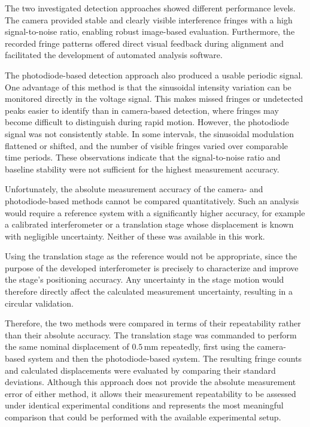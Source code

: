The two investigated detection approaches showed different performance levels. The camera provided stable and clearly visible interference fringes with a high signal-to-noise ratio, enabling robust image-based evaluation. Furthermore, the recorded fringe patterns offered direct visual feedback during alignment and facilitated the development of automated analysis software.

The photodiode-based detection approach also produced a usable periodic signal. One advantage of this method is that the sinusoidal intensity variation can be monitored directly in the voltage signal. This makes missed fringes or undetected peaks easier to identify than in camera-based detection, where fringes may become difficult to distinguish during rapid motion. However, the photodiode signal was not consistently stable. In some intervals, the sinusoidal modulation flattened or shifted, and the number of visible fringes varied over comparable time periods. These observations indicate that the signal-to-noise ratio and baseline stability were not sufficient for the highest measurement accuracy.

Unfortunately, the absolute measurement accuracy of the camera- and photodiode-based methods cannot be compared quantitatively. Such an analysis would require a reference system with a significantly higher accuracy, for example a calibrated interferometer or a translation stage whose displacement is known with negligible uncertainty. Neither of these was available in this work.

Using the translation stage as the reference would not be appropriate, since the purpose of the developed interferometer is precisely to characterize and improve the stage's positioning accuracy. Any uncertainty in the stage motion would therefore directly affect the calculated measurement uncertainty, resulting in a circular validation.

Therefore, the two methods were compared in terms of their repeatability rather than their absolute accuracy. The translation stage was commanded to perform the same nominal displacement of \(0.5\,\mathrm{mm}\) repeatedly, first using the camera-based system and then the photodiode-based system. The resulting fringe counts and calculated displacements were evaluated by comparing their standard deviations. Although this approach does not provide the absolute measurement error of either method, it allows their measurement repeatability to be assessed under identical experimental conditions and represents the most meaningful comparison that could be performed with the available experimental setup.

